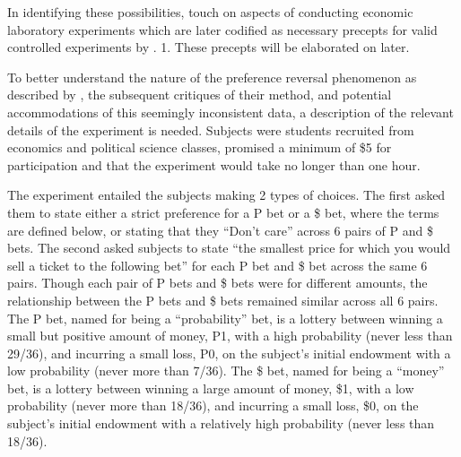 \documentclass[../main.tex]{subfiles}
\begin{document}
In identifying these possibilities, \textcite{Grether1979} touch on aspects of conducting economic laboratory experiments which are later codified as necessary precepts for valid controlled experiments by \textcite{Smith1982}.
1. 
These precepts will be elaborated on later.

To better understand the nature of the preference reversal phenomenon as described by \textcite{Grether1979}, the subsequent critiques of their method, and potential accommodations of this seemingly inconsistent data, a description of the relevant details of the experiment is needed.
Subjects were students recruited from economics and political science classes, promised a minimum of \$5 for participation and that the experiment would take no longer than one hour.

The experiment entailed the subjects making 2 types of choices.
The first asked them to state either a strict preference for a P bet or a \$ bet, where the terms are defined below, or stating that they \enquote{Don't care} across 6 pairs of P and \$ bets.
The second asked subjects to state \enquote{the smallest price for which you would sell a ticket to the following bet} \parencite*[630]{Grether1979} for each P bet and \$ bet across the same 6 pairs.
Though each pair of P bets and \$ bets were for different amounts, the relationship between the P bets and \$ bets remained similar across all 6 pairs.
The P bet, named for being a \enquote{probability} bet, is a lottery between winning a small but positive amount of money, P1, with a high probability (never less than 29/36), and incurring a small loss, P0, on the subject's initial endowment with a low probability (never more than 7/36).
The \$ bet, named for being a \enquote{money} bet, is a lottery between winning a large amount of money, \$1, with a  low probability (never more than 18/36), and incurring a small loss, \$0, on the subject's initial endowment with a relatively high probability (never less than 18/36).
\end{document}
